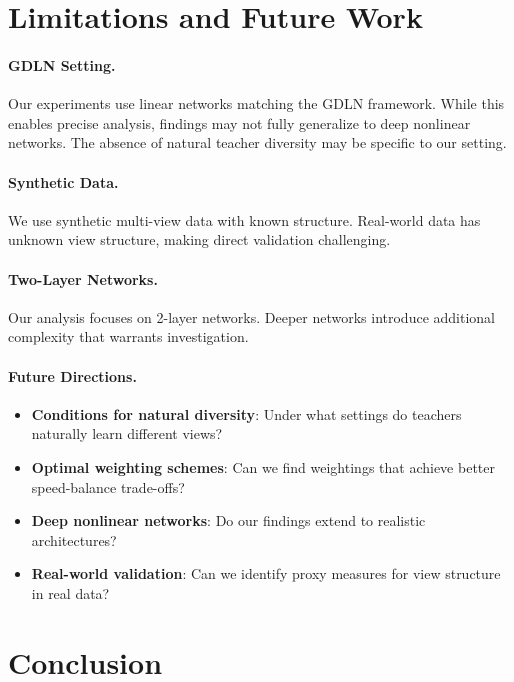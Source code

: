 \documentclass{article}
\begin{document}
\section{Limitations and Future Work}
\label{sec:limitations}

\paragraph{GDLN Setting.} Our experiments use linear networks matching the GDLN framework. While this enables precise analysis, findings may not fully generalize to deep nonlinear networks. The absence of natural teacher diversity may be specific to our setting.

\paragraph{Synthetic Data.} We use synthetic multi-view data with known structure. Real-world data has unknown view structure, making direct validation challenging.

\paragraph{Two-Layer Networks.} Our analysis focuses on 2-layer networks. Deeper networks introduce additional complexity that warrants investigation.

\paragraph{Future Directions.}
\begin{itemize}
    \item \textbf{Conditions for natural diversity}: Under what settings do teachers naturally learn different views?
    \item \textbf{Optimal weighting schemes}: Can we find weightings that achieve better speed-balance trade-offs?
    \item \textbf{Deep nonlinear networks}: Do our findings extend to realistic architectures?
    \item \textbf{Real-world validation}: Can we identify proxy measures for view structure in real data?
\end{itemize}

\section{Conclusion}
\label{sec:conclusion}
\end{document}
